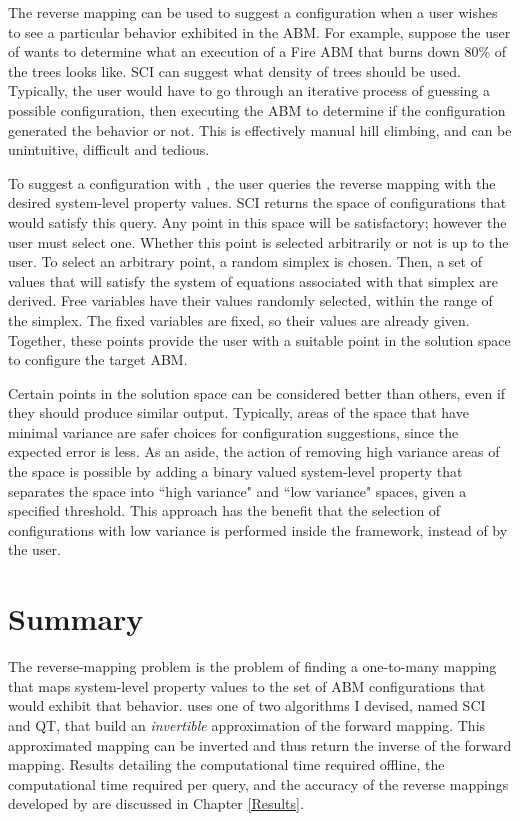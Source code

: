 The reverse mapping can be used to suggest a configuration when a user wishes to see a particular behavior exhibited in the ABM.
For example, suppose the user of \fw wants to determine what an execution of a Fire ABM that burns down 80\% of the trees looks like.
SCI can suggest what density of trees should be used.
Typically, the user would have to go through an iterative process of guessing a possible configuration, then executing the ABM to determine if the configuration generated the behavior or not.
This is effectively manual hill climbing, and can be unintuitive, difficult and tedious.

To suggest a configuration with \fw, the user queries the reverse mapping with the desired system-level property values.
SCI returns the space of configurations that would satisfy this query.
Any point in this space will be satisfactory; however the user must select one.
Whether this point is selected arbitrarily or not is up to the user.
To select an arbitrary point, a random simplex is chosen.
Then, a set of values that will satisfy the system of equations associated with that simplex are derived.
Free variables have their values randomly selected, within the range of the simplex.
The fixed variables are fixed, so their values are already given.
Together, these points provide the user with a suitable point in the solution space to configure the target ABM.

Certain points in the solution space can be considered better than others, even if they should produce similar output.
Typically, areas of the space that have minimal variance are safer choices for configuration suggestions, since the expected error is less.
As an aside, the action of removing high variance areas of the space is possible by adding a binary valued system-level property that separates the space into ``high variance" and ``low variance" spaces, given a specified threshold.
This approach has the benefit that the selection of configurations with low variance is performed inside the framework, instead of by the user.




\section{Summary}
The reverse-mapping problem is the problem of finding a one-to-many mapping that maps system-level property values to the set of ABM configurations that would exhibit that behavior.
\fw uses one of two algorithms I devised, named SCI and QT, that build an \textit{invertible} approximation of the forward mapping.
This approximated mapping can be inverted and thus return the inverse of the forward mapping.
Results detailing the computational time required offline, the computational time required per query, and the accuracy of the reverse mappings developed by \fw are discussed in Chapter \ref{Results}.
